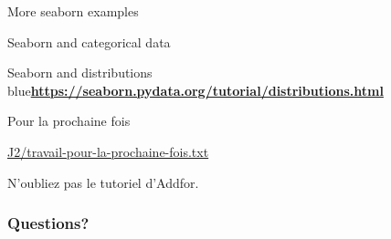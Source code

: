 \begin{frame}{More seaborn examples}

\end{frame}

\begin{frame}{Seaborn and categorical data}

\end{frame}

\begin{frame}{Seaborn and distributions}
  blue{\bf\url{https://seaborn.pydata.org/tutorial/distributions.html}}
\end{frame}

\begin{frame}{Pour la prochaine fois}

  \centerline{\url{J2/travail-pour-la-prochaine-fois.txt}}

  \bigskip
  \centerline{N'oubliez pas le tutoriel d'Addfor.}
\end{frame}


\begin{frame}
  \frametitle{Questions?}
\end{frame}


